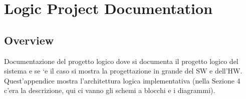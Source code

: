 
\chapter{Logic Project Documentation}


\section{Overview}

Documentazione del progetto logico dove si documenta il progetto logico
del \cite{loser}sistema e se `e il caso si mostra la progettazione
in grande del SW e dell\textquoteright{}HW. Quest\textquoteright{}appendice
mostra l\textquoteright{}architettura logica implementativa (nella
Sezione 4 c\textquoteright{}era la descrizione, qui ci vanno gli schemi
a blocchi e i diagrammi).
